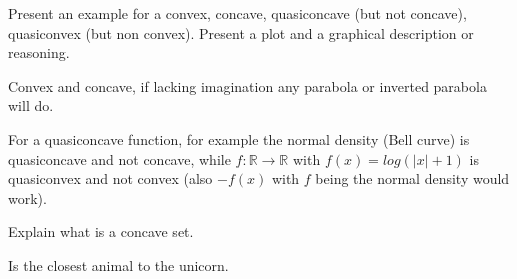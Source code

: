 \documentclass[a4paper,answers]{exam}
\begin{document}
{\begin{questions}
\begin{parts}
\begin{solution}
\begin{center}
			\end{center}
		\end{solution}

\end{parts}

\question Present an example for a convex, concave, quasiconcave (but not concave), quasiconvex (but non convex). Present a plot and a graphical description or reasoning.
\begin{solution}
Convex and concave, if lacking imagination any parabola or inverted parabola will do.

For a quasiconcave function, for example the normal density (Bell curve) is quasiconcave and not concave, while $f:\mathds{R}\rightarrow\mathds{R}$ with $f(x)=log(|x|+1)$ is quasiconvex and not convex (also $-f(x)$ with $f$ being the normal density would work).
\end{solution}

\question Explain what is a concave set.
\begin{solution}
	Is the closest animal to the unicorn.
\end{solution}

\end{questions}
}
\end{document}
